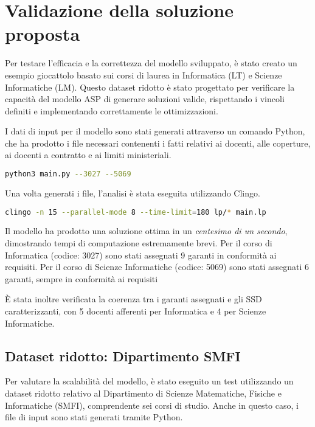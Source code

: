 \section{Validazione della soluzione proposta}
\label{sec:expval}

Per testare l'efficacia e la correttezza del modello sviluppato, è stato creato un esempio 
giocattolo basato sui corsi di laurea in Informatica (LT) e Scienze Informatiche (LM). 
Questo dataset ridotto è stato progettato per verificare la capacità del modello ASP di 
generare soluzioni valide, rispettando i vincoli definiti e implementando correttamente 
le ottimizzazioni.

I dati di input per il modello sono stati generati attraverso un comando Python, che ha 
prodotto i file necessari contenenti i fatti relativi ai docenti, alle coperture, ai 
docenti a contratto e ai limiti ministeriali.

\begin{lstlisting}[language=bash]
 python3 main.py --3027 --5069
\end{lstlisting}

Una volta generati i file, l'analisi è stata eseguita utilizzando Clingo.

\begin{lstlisting}[language=bash]
 clingo -n 15 --parallel-mode 8 --time-limit=180 lp/* main.lp
\end{lstlisting}

Il modello ha prodotto una soluzione ottima in un \textit{centesimo di un secondo}, 
dimostrando tempi di computazione estremamente brevi. Per il corso di Informatica 
(codice: 3027) sono stati assegnati 9 garanti in conformità ai requisiti. Per il corso di 
Scienze Informatiche (codice: 5069) sono stati assegnati 6 garanti, sempre in conformità ai 
requisiti

È stata inoltre verificata la coerenza tra i garanti assegnati e gli SSD caratterizzanti, 
con 5 docenti afferenti per Informatica e 4 per Scienze Informatiche.

\subsection{Dataset ridotto: Dipartimento SMFI}
\label{sec:-dataset-dipartimento-smfi}

Per valutare la scalabilità del modello, è stato eseguito un test utilizzando un dataset 
ridotto relativo al Dipartimento di Scienze Matematiche, Fisiche e Informatiche (SMFI), 
comprendente sei corsi di studio. Anche in questo caso, i file di input sono stati generati 
tramite Python.

